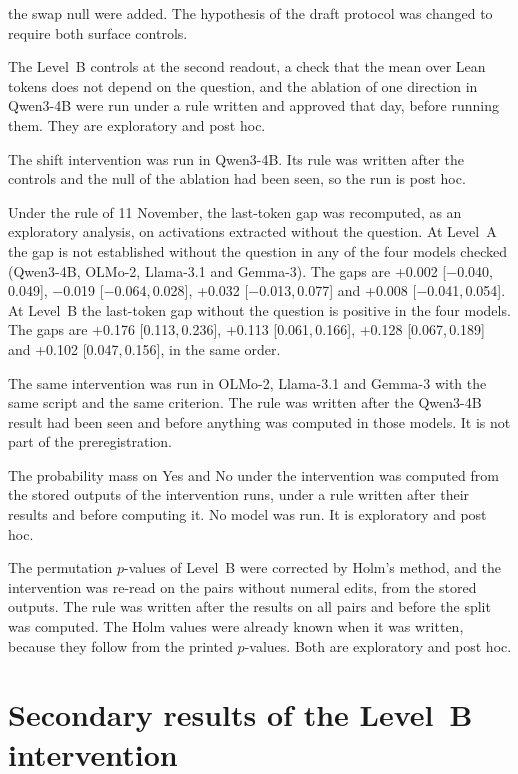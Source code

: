 \documentclass[10pt]{article}
\newcommand{\ic}[2]{[#1,\,#2]}
\begin{document}
\begin{description}[leftmargin=1.2em]
the swap null were added. The hypothesis of the draft protocol was changed to require both surface controls.
\item[11 Nov] The Level~B controls at the second readout, a check that the mean over Lean tokens does not depend on
the question, and the ablation of one direction in Qwen3-4B were run under a rule written and approved that day,
before running them. They are exploratory and post hoc.
\item[11--12 Nov] The shift intervention was run in Qwen3-4B. Its rule was written after the controls and the null of
the ablation had been seen, so the run is post hoc.
\item[12 Nov] Under the rule of 11 November, the last-token gap was recomputed, as an exploratory analysis, on activations
extracted without the question. At Level~A the gap is not established without the question in any of the four models checked (Qwen3-4B, OLMo-2, Llama-3.1 and Gemma-3). The gaps are +0.002
\ic{−0.040}{0.049}, −0.019 \ic{−0.064}{0.028}, +0.032 \ic{−0.013}{0.077} and +0.008 \ic{−0.041}{0.054}. At Level~B the last-token gap without the question is positive in the four models. The gaps are +0.176 \ic{0.113}{0.236}, +0.113 \ic{0.061}{0.166}, +0.128 \ic{0.067}{0.189} and +0.102 \ic{0.047}{0.156}, in the same order.
\item[12--13 Nov] The same intervention was run in OLMo-2, Llama-3.1 and Gemma-3 with the same script and the same
criterion. The rule was written after the Qwen3-4B result had been seen and before anything was computed in those
models. It is not part of the preregistration.
\item[13 Nov] The probability mass on Yes and No under the intervention was computed from the stored outputs of the
intervention runs, under a rule written after their results and before computing it. No model was run. It is
exploratory and post hoc.
\item[13 Nov] The permutation $p$-values of Level~B were corrected by Holm's method, and the intervention was re-read
on the pairs without numeral edits, from the stored outputs. The rule was written after the results on all pairs and
before the split was computed. The Holm values were already known when it was written, because they follow from the
printed $p$-values. Both are exploratory and post hoc.
\end{description}

\section{Secondary results of the Level~B intervention}\label{app:intervencion}
\end{document}
